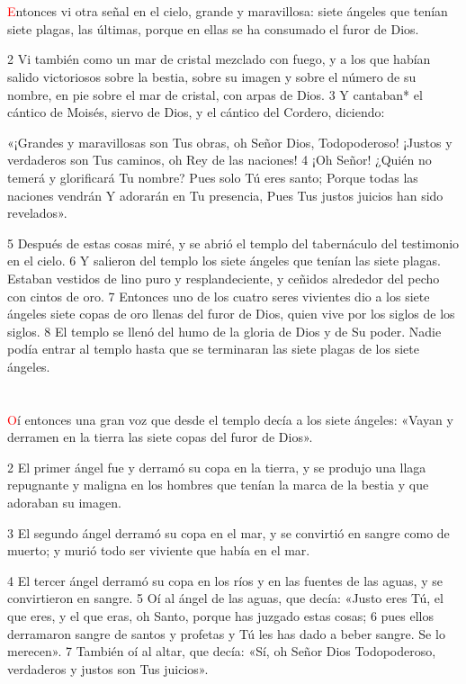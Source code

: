 \documentclass[12pt,twocolumn,twoside]{book}
\begin{document}
\chapter{}
\lettrine[lines=4]{\textcolor{red}{E}}{}ntonces vi otra señal en el cielo, grande y maravillosa: siete ángeles que tenían siete plagas, las últimas, porque en ellas se ha consumado el furor de Dios.

2 Vi también como un mar de cristal mezclado con fuego, y a los que habían salido victoriosos sobre la bestia, sobre su imagen y sobre el número de su nombre, en pie sobre el mar de cristal, con arpas de Dios. 3 Y cantaban* el cántico de Moisés, siervo de Dios, y el cántico del Cordero, diciendo:

«¡Grandes y maravillosas son Tus obras, oh Señor Dios, Todopoderoso!
¡Justos y verdaderos son Tus caminos, oh Rey de las naciones!
4 
¡Oh Señor! ¿Quién no temerá y glorificará Tu nombre?
Pues solo Tú eres santo;
Porque todas las naciones vendrán
Y adorarán en Tu presencia,
Pues Tus justos juicios han sido revelados».

5 Después de estas cosas miré, y se abrió el templo del tabernáculo del testimonio en el cielo. 6 Y salieron del templo los siete ángeles que tenían las siete plagas. Estaban vestidos de lino puro y resplandeciente, y ceñidos alrededor del pecho con cintos de oro. 7 Entonces uno de los cuatro seres vivientes dio a los siete ángeles siete copas de oro llenas del furor de Dios, quien vive por los siglos de los siglos. 8 El templo se llenó del humo de la gloria de Dios y de Su poder. Nadie podía entrar al templo hasta que se terminaran las siete plagas de los siete ángeles.
\chapter{}
\lettrine[lines=4]{\textcolor{red}{O}}{}í entonces una gran voz que desde el templo decía a los siete ángeles: «Vayan y derramen en la tierra las siete copas del furor de Dios».

2 El primer ángel fue y derramó su copa en la tierra, y se produjo una llaga repugnante y maligna en los hombres que tenían la marca de la bestia y que adoraban su imagen.

3 El segundo ángel derramó su copa en el mar, y se convirtió en sangre como de muerto; y murió todo ser viviente que había en el mar.

4 El tercer ángel derramó su copa en los ríos y en las fuentes de las aguas, y se convirtieron en sangre. 5 Oí al ángel de las aguas, que decía: «Justo eres Tú, el que eres, y el que eras, oh Santo, porque has juzgado estas cosas; 6 pues ellos derramaron sangre de santos y profetas y Tú les has dado a beber sangre. Se lo merecen». 7 También oí al altar, que decía: «Sí, oh Señor Dios Todopoderoso, verdaderos y justos son Tus juicios».
\end{document}

